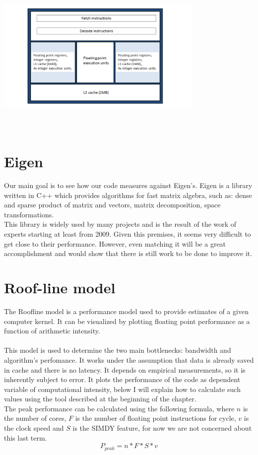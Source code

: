 \documentclass[11pt,a4paper,oneside,titlepage,openright]{book}
\begin{document}
\begin{center}
\includegraphics[width=10cm, height=8cm]{interlagos}
\end{center}

\section{Eigen}
Our main goal is to see how our code measures against Eigen's. 
Eigen is a library written in C++ which provides algorithms for fast matrix algebra, such as: dense and sparse product of matrix and vectors, matrix decomposition, space transformations. \\This library is widely used by many projects and is the result of the work of experts starting at least from 2009. Given this premises, it seems very difficult to get close to their performance. However, even matching it will be a great accomplishment and would show that there is still work to be done to improve it. 

\section{Roof-line model}
The Roofline model is a performance model used to provide estimates of a given computer kernel. 
It can be visualized by plotting floating point performance as a function of arithmetic intensity. \\\\
This model is used to determine the two main bottlenecks: bandwidth and algorithm's perfomance. It works under the assumption that data is already saved in cache and there  is no latency. It depends on empirical measurements, so it is inherently subject to error. 
It plots the performance of the code as dependent variable of computational intensity, below I will explain how to calculate such values using the tool described at the beginning of the chapter. 
\\
The peak performance can be calculated using the following formula, where $n$ is the number of cores, $F$ is the number of floating point instructions for cycle, $v$ is the clock speed and $S$ is the SIMDY feature, for now we are not concerned about this last term. 
$$ P_{peak} = n * F * S * v $$ 
\end{document}
